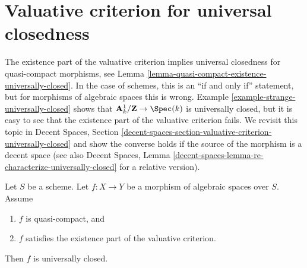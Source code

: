 \section{Valuative criterion for universal closedness}
\label{section-valuative-criterion-universally-closed}

\noindent
The existence part of the valuative criterion implies universal
closedness for quasi-compact morphisms, see
Lemma \ref{lemma-quasi-compact-existence-universally-closed}.
In the case of schemes, this is an ``if and only if'' statement,
but for morphisms of algebraic spaces this is wrong.
Example \ref{example-strange-universally-closed}
shows that $\mathbf{A}^1_k/\mathbf{Z} \to \Spec(k)$ is universally
closed, but it is easy to see that the existence part of
the valuative criterion fails. We revisit this topic in
Decent Spaces, Section
\ref{decent-spaces-section-valuative-criterion-universally-closed}
and show the converse holds if the source of the morphism is a decent space
(see also
Decent Spaces,
Lemma \ref{decent-spaces-lemma-re-characterize-universally-closed}
for a relative version).

\begin{lemma}
\label{lemma-quasi-compact-existence-universally-closed}
Let $S$ be a scheme.
Let $f : X \to Y$ be a morphism of algebraic spaces over $S$.
Assume
\begin{enumerate}
\item $f$ is quasi-compact, and
\item $f$ satisfies the existence part of the valuative criterion.
\end{enumerate}
Then $f$ is universally closed.
\end{lemma}

